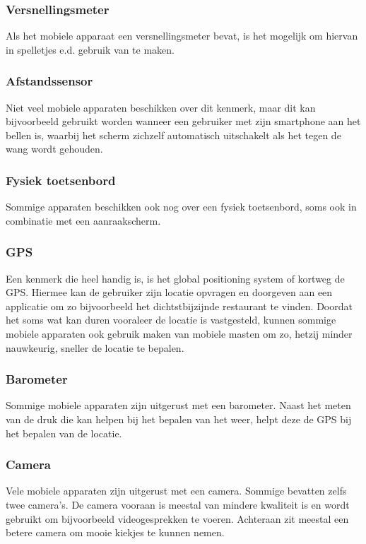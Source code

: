 \subsubsection{Versnellingsmeter}
Als het mobiele apparaat een versnellingsmeter bevat, is het mogelijk om hiervan in spelletjes e.d. gebruik van te maken.

\subsubsection{Afstandssensor}
Niet veel mobiele apparaten beschikken over dit kenmerk, maar dit kan bijvoorbeeld gebruikt worden wanneer een gebruiker met zijn smartphone aan het bellen is, waarbij het scherm zichzelf automatisch uitschakelt als het tegen de wang wordt gehouden.

\subsubsection{Fysiek toetsenbord}
Sommige apparaten beschikken ook nog over een fysiek toetsenbord, soms ook in combinatie met een aanraakscherm. 

\subsubsection{GPS}
Een kenmerk die heel handig is, is het global positioning system of kortweg de GPS. Hiermee kan de gebruiker zijn locatie opvragen en doorgeven aan een applicatie om zo bijvoorbeeld het dichtstbijzijnde restaurant te vinden. Doordat het soms wat kan duren vooraleer de locatie is vastgesteld, kunnen sommige mobiele apparaten ook gebruik maken van mobiele masten om zo, hetzij minder nauwkeurig, sneller de locatie te bepalen.

\subsubsection{Barometer}
Sommige mobiele apparaten zijn uitgerust met een barometer. Naast het meten van de druk die kan helpen bij het bepalen van het weer, helpt deze de GPS bij het bepalen van de locatie.

\subsubsection{Camera}
Vele mobiele apparaten zijn uitgerust met een camera. Sommige bevatten zelfs twee camera's. De camera vooraan is meestal van mindere kwaliteit is en wordt gebruikt om bijvoorbeeld videogesprekken te voeren. Achteraan zit meestal een betere camera om mooie kiekjes te kunnen nemen.

